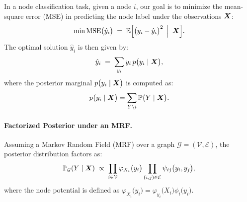 In a node classification task, given a node \(i\), our goal is to minimize the mean-square error (MSE) in predicting the node label under the observations \(\boldsymbol{X}\):
\begin{align}
    \min \mathrm{MSE}\bigl(\hat{y}_i\bigr) 
    \;=\; 
    \mathbb{E}\Bigl[\bigl(y_i - \hat{y}_i\bigr)^2 \,\Bigm|\;\boldsymbol{X}\Bigr].
\end{align}
The optimal solution \(\hat{y}_i\) is then given by:
\begin{align}
    \hat{y}_i 
    \;=\; 
    \sum_{y_i} y_i \, p\bigl(y_i \mid \boldsymbol{X}\bigr),
\end{align}
where the posterior marginal \(p\bigl(y_i \mid \boldsymbol{X}\bigr)\) is computed as:
\begin{align}
    p\bigl(y_i \mid \boldsymbol{X}\bigr) = \sum_{Y \setminus i} \mathbb{P}\bigl(Y \mid \boldsymbol{X}\bigr).
\end{align}

\paragraph{Factorized Posterior under an MRF.}
Assuming a Markov Random Field (MRF) over a graph \(\mathcal{G}=(\mathcal{V}, \mathcal{E})\), the posterior distribution factors as:
\begin{align}
    \mathbb{P}_\mathcal{G}(Y \mid \boldsymbol{X}) 
    \;\propto\; 
    \prod_{i \in \mathcal{V}} \varphi_{X_i}\bigl(y_i\bigr)
    \prod_{(i,j) \in \mathcal{E}} \psi_{ij}\bigl(y_i, y_j\bigr),
\end{align}
where the node potential is defined as \(\varphi_{X_i}\bigl(y_i\bigr) = \varphi_{y_i}\bigl(X_i\bigr)\phi_i\bigl(y_i\bigr)\).


